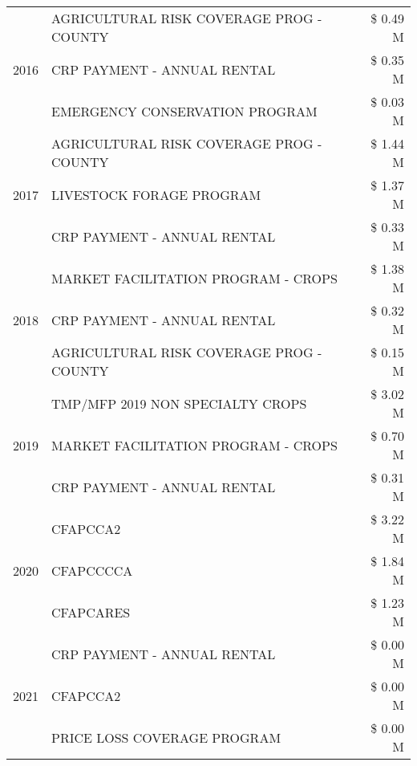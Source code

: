 \begin{tabular}{llr}
\cline{1-3}
\multirow[t]{3}{*}{2016} & AGRICULTURAL RISK COVERAGE PROG - COUNTY & \$ 0.49 M \\
 & CRP PAYMENT - ANNUAL RENTAL & \$ 0.35 M \\
 & EMERGENCY CONSERVATION PROGRAM & \$ 0.03 M \\
\cline{1-3}
\multirow[t]{3}{*}{2017} & AGRICULTURAL RISK COVERAGE PROG - COUNTY & \$ 1.44 M \\
 & LIVESTOCK FORAGE PROGRAM & \$ 1.37 M \\
 & CRP PAYMENT - ANNUAL RENTAL & \$ 0.33 M \\
\cline{1-3}
\multirow[t]{3}{*}{2018} & MARKET FACILITATION PROGRAM - CROPS & \$ 1.38 M \\
 & CRP PAYMENT - ANNUAL RENTAL & \$ 0.32 M \\
 & AGRICULTURAL RISK COVERAGE PROG - COUNTY & \$ 0.15 M \\
\cline{1-3}
\multirow[t]{3}{*}{2019} & TMP/MFP 2019 NON SPECIALTY CROPS & \$ 3.02 M \\
 & MARKET FACILITATION PROGRAM - CROPS & \$ 0.70 M \\
 & CRP PAYMENT - ANNUAL RENTAL & \$ 0.31 M \\
\cline{1-3}
\multirow[t]{3}{*}{2020} & CFAPCCA2 & \$ 3.22 M \\
 & CFAPCCCCA & \$ 1.84 M \\
 & CFAPCARES & \$ 1.23 M \\
\cline{1-3}
\multirow[t]{3}{*}{2021} & CRP PAYMENT - ANNUAL RENTAL & \$ 0.00 M \\
 & CFAPCCA2 & \$ 0.00 M \\
 & PRICE LOSS COVERAGE PROGRAM & \$ 0.00 M \\
\cline{1-3}
\bottomrule
\end{tabular}
